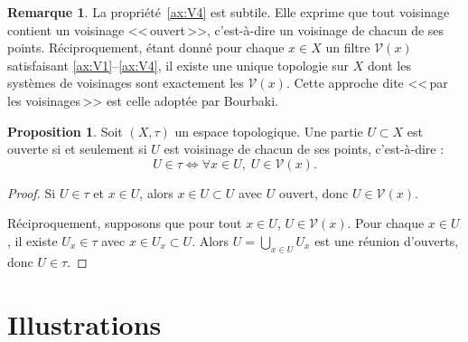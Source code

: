 \documentclass[12pt,a4paper,openany]{book}
\theoremstyle{definition}
\theoremstyle{cours}
\newtheorem{proposition}[theoreme]{Proposition}
\theoremstyle{coursnormal}
\newtheorem{remarque}[theoreme]{Remarque}
\newcommand{\Vois}[1]{\mathcal{V}(#1)}
\begin{document}
\begin{remarque}
  La propriété~\ref{ax:V4} est subtile. Elle exprime que tout voisinage contient un voisinage <<\,ouvert\,>>, c'est-à-dire un voisinage de chacun de ses points. Réciproquement, étant donné pour chaque $x \in X$ un filtre $\Vois{x}$ satisfaisant \ref{ax:V1}--\ref{ax:V4}, il existe une unique topologie sur $X$ dont les systèmes de voisinages sont exactement les $\Vois{x}$. Cette approche dite <<\,par les voisinages\,>> est celle adoptée par Bourbaki.
\end{remarque}

\begin{proposition}\label{prop:ouvert-voisinage}
  Soit $(X,\tau)$ un espace topologique. Une partie $U \subset X$ est ouverte si et seulement si $U$ est voisinage de chacun de ses points, c'est-à-dire :
  \[
    U \in \tau \iff \forall x \in U,\; U \in \Vois{x}.
  \]
\end{proposition}

\begin{proof}
  Si $U \in \tau$ et $x \in U$, alors $x \in U \subset U$ avec $U$ ouvert, donc $U \in \Vois{x}$.

  Réciproquement, supposons que pour tout $x \in U$, $U \in \Vois{x}$. Pour chaque $x \in U$, il existe $U_x \in \tau$ avec $x \in U_x \subset U$. Alors $U = \bigcup_{x \in U} U_x$ est une réunion d'ouverts, donc $U \in \tau$.
\end{proof}

\section{Illustrations}
\label{sec:illustrations-chap1}

\begin{center}
\end{center}
\end{document}
